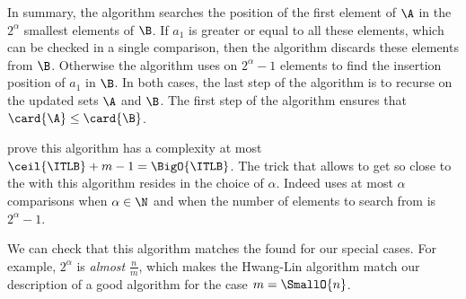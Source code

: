 In summary, the algorithm searches the position of the first element of \(\A\)
in the \(2^{\alpha}\) smallest elements of \(\B\). If \(a_1\) is greater or
equal to all these elements, which can be checked in a single comparison, then
the algorithm discards these elements from \(\B\). Otherwise the algorithm uses
\binarysearch on \(2^{\alpha}-1\) elements to find the insertion position of
\(a_1\) in \(\B\). In both cases, the last step of the algorithm is to recurse
on the updated sets \(\A\) and \(\B\). The first step of the algorithm ensures that
\(\card{\A} \le \card{\B}\).

\citet*{DBLP:journals/siamcomp/HwangL72} prove this algorithm has a complexity
at most \(\ceil{\ITLB} + m - 1 = \BigO{\ITLB}\). The trick that allows to
get so close to the \ITLB with this algorithm resides in the choice of
\(\alpha\). Indeed \binarysearch uses at most \(\alpha\) comparisons
when \(\alpha \in \N\) and when the number of elements to search
from is \(2^{\alpha}-1\).

We can check that this algorithm matches the \ITLB found for our
special cases. For example, \(2^\alpha\) is \emph{almost} \(\frac{n}{m}\),
which makes the Hwang-Lin algorithm match our description of a good algorithm
for the case \(m = \SmallO{n}\).
